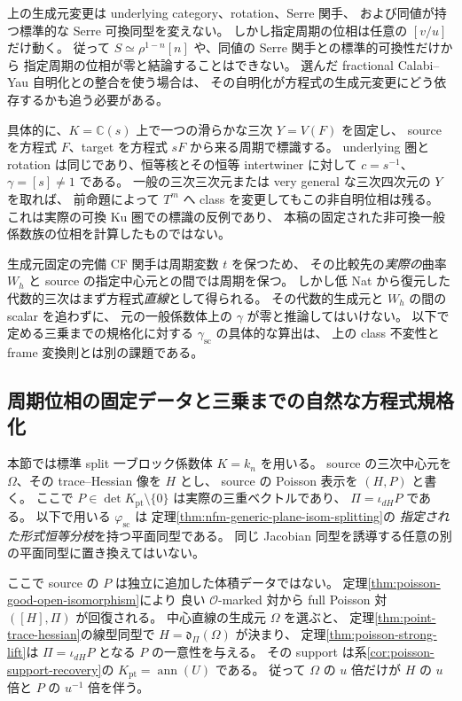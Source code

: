 \begin{remark}
上の生成元変更は underlying category、rotation、Serre 関手、
および同値が持つ標準的な Serre 可換同型を変えない。
しかし指定周期の位相は任意の $[v/u]$ だけ動く。
従って $S\simeq\rho^{1-n}[n]$ や、同値の Serre 関手との標準的可換性だけから
指定周期の位相が零と結論することはできない。
選んだ fractional Calabi--Yau 自明化との整合を使う場合は、
その自明化が方程式の生成元変更にどう依存するかも追う必要がある。

具体的に、$K=\mathbb C(s)$ 上で一つの滑らかな三次 $Y=V(F)$ を固定し、
source を方程式 $F$、target を方程式 $sF$ から来る周期で標識する。
underlying 圏と rotation は同じであり、恒等核とその恒等 intertwiner に対して
$c=s^{-1}$、$\gamma=[s]\ne1$ である。
一般の三次三次元または very general な三次四次元の $Y$ を取れば、
前命題によって $T^m$ へ class を変更してもこの非自明位相は残る。
これは実際の可換 Ku 圏での標識の反例であり、
本稿の固定された非可換一般係数族の位相を計算したものではない。

生成元固定の完備 CF 関手は周期変数 $t$ を保つため、
その比較先の\emph{実際の}曲率 $W_h$ と source の指定中心元との間では周期を保つ。
しかし低 Nat から復元した代数的三次はまず方程式\emph{直線}として得られる。
その代数的生成元と $W_h$ の間の scalar を追わずに、
元の一般係数体上の $\gamma$ が零と推論してはいけない。
以下で定める三乗までの規格化に対する $\gamma_{\mathrm{sc}}$ の具体的な算出は、
上の class 不変性と frame 変換則とは別の課題である。
\end{remark}
\subsection{周期位相の固定データと三乗までの自然な方程式規格化}

本節では標準 split 一ブロック係数体 $K=k_n$ を用いる。
source の三次中心元を $\Omega$、その trace--Hessian 像を $H$ とし、
source の Poisson 表示を $(H,P)$ と書く。
ここで $P\in\det K_{\mathrm{pt}}\setminus\{0\}$ は実際の三重ベクトルであり、
$\Pi=\iota_{dH}P$ である。
以下で用いる $\varphi_{\mathrm{sc}}$ は
定理\ref{thm:nfm-generic-plane-isom-splitting}の
\emph{指定された形式恒等分枝}を持つ平面同型である。
同じ Jacobian 同型を誘導する任意の別の平面同型に置き換えてはいない。

ここで source の $P$ は独立に追加した体積データではない。
定理\ref{thm:poisson-good-open-isomorphism}により
良い $\mathcal O$-marked 対から full Poisson 対 $([H],\Pi)$ が回復される。
中心直線の生成元 $\Omega$ を選ぶと、
定理\ref{thm:point-trace-hessian}の線型同型で
$H=\mathfrak d_\Pi(\Omega)$ が決まり、
定理\ref{thm:poisson-strong-lift}は
$\Pi=\iota_{dH}P$ となる $P$ の一意性を与える。
その support は系\ref{cor:poisson-support-recovery}の
$K_{\mathrm{pt}}=\operatorname{ann}(U)$ である。
従って $\Omega$ の $u$ 倍だけが $H$ の $u$ 倍と $P$ の $u^{-1}$ 倍を伴う。

